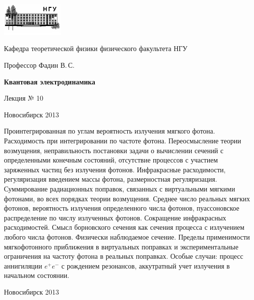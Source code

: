 \documentclass[12pt,pagesize,paper=192mm:108mm]{scrbook}
\begin{document}
\begin{titlepage}
  \vspace*{-1em}
  \begin{center}
    \includegraphics[width=0.23\textwidth]{../NSU-logo}

    Кафедра теоретической физики физического факультета НГУ
    \medskip

    \Large
    Профессор Фадин В.\,С.
    \bigskip

    \huge
    \textbf{Квантовая электродинамика}
    \bigskip

    \Large
    Лекция № 10
    \vfill

    \normalsize
    \vfill

    \normalsize \ccbysa\hspace{0.5em}  Новосибирск 2013
  \end{center}
\end{titlepage}
\vspace*{-1em}
\begin{center}
\vfill
  \begin{minipage}{0.8\linewidth}
    Проинтегрированная по углам вероятность излучения мягкого
    фотона. Расходимость при интегрировании по частоте
    фотона. Переосмысление теории возмущения, неправильность
    постановки задачи о вычислении сечений с определенными конечным
    состояний, отсутствие процессов с участием заряженных частиц без
    излучения фотонов. Инфракрасные расходимости, регуляризация
    введением массы фотона, размерностная регуляризация.  Суммирование
    радиационных поправок, связанных с виртуальными мягкими фотонами,
    во всех порядках теории возмущения. Среднее число реальных мягких
    фотонов, вероятность излучения определенного числа фотонов,
    пуассоновское распределение по числу излученных
    фотонов. Сокращение инфракрасных расходимостей. Смысл борновского
    сечения как сечения процесса с излучением любого числа
    фотонов. Физически наблюдаемое сечение. Пределы применимости
    мягкофотонного приближения в виртуальных поправках и
    экспериментальные ограничения на частоту фотона в реальных
    поправках. Особые случаи: процесс аннигиляции $e^+e^-$ с рождением
    резонансов, аккутратный учет излучения в начальном состоянии.
  \end{minipage}
  \vfill

  \normalsize \ccbysa\hspace{0.5em} Новосибирск 2013
\end{center}
\end{document}
